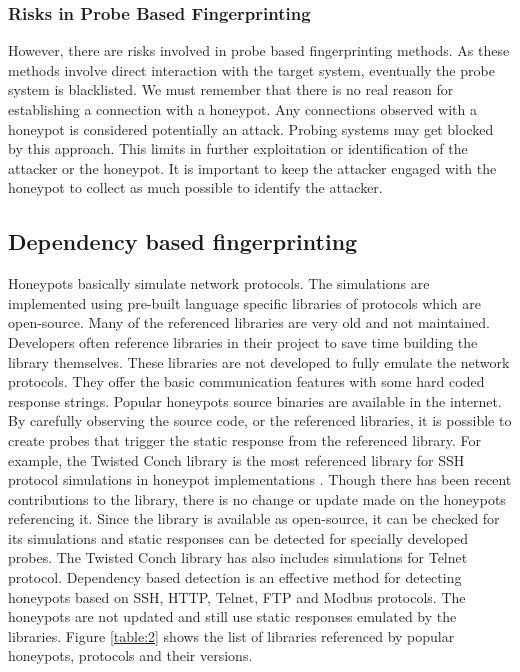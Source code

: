 \documentclass[letterpaper, 10 pt, conference]{ieeeconf}  %
\begin{document}
\subsubsection{Risks in Probe Based Fingerprinting}
However, there are risks involved in probe based fingerprinting methods. As these methods involve direct interaction with the target system, eventually the probe system is blacklisted. We must remember that there is no real reason for establishing a connection with a honeypot. Any connections observed with a honeypot is considered potentially an attack. Probing systems may get blocked by this approach. This limits in further exploitation or identification of the attacker or the honeypot. It is important to keep the attacker engaged with the honeypot to collect as much possible to identify the attacker. 

\subsection{Dependency based fingerprinting}
Honeypots basically simulate network protocols. The simulations are implemented using pre-built language specific libraries of protocols which are open-source. Many of the referenced libraries are very old and not maintained. Developers often reference libraries in their project to save time building the library themselves. These libraries are not developed to fully emulate the network protocols. They offer the basic communication features with some hard coded response strings. Popular honeypots source binaries are available in the internet. By carefully observing the source code, or the referenced libraries, it is possible to create probes that trigger the static response from the referenced library. For example, the Twisted Conch\cite{twisted}  library is the most referenced library for SSH protocol simulations in honeypot implementations \cite{counting}. Though there has been recent contributions to the library, there is no change or update made on the honeypots referencing it. Since the library is available as open-source, it can be checked for its simulations and static responses can be detected for specially developed probes. The Twisted Conch library has also includes simulations for Telnet protocol. Dependency based detection is an effective method for detecting honeypots based on SSH, HTTP, Telnet, FTP and Modbus protocols. The honeypots are not updated and still use static responses emulated by the libraries. Figure \ref{table:2} \cite{Vetterl2018} shows the list of libraries referenced by popular honeypots, protocols and their versions. 
\end{document}
